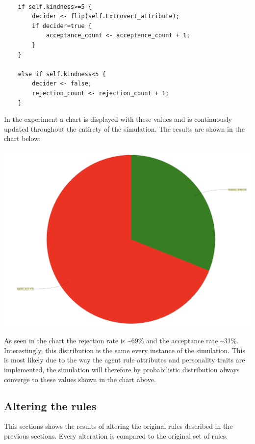 \documentclass[a4paper,10pt]{article}
\begin{document}
\begin{verbatim}

    if self.kindness>=5 {
		decider <- flip(self.Extrovert_attribute);
		if decider=true {
			acceptance_count <- acceptance_count + 1;
        }
    }
    
    else if self.kindness<5 {
	    decider <- false;
	    rejection_count <- rejection_count + 1;
    }
\end{verbatim}

In the experiment a chart is displayed with these values and is continuously updated throughout the entirety of the simulation. The results are shown in the chart below:

\begin{center}{}
\centering\includegraphics[scale=0.05]{original_exp.png}\par
\end{center}

As seen in the chart the rejection rate is \textasciitilde 69\% and the acceptance rate \textasciitilde 31\%. Interestingly, this distribution is the same every instance of the simulation. This is most likely due to the way the agent rule attributes and personality traits are implemented, the simulation will therefore by probabilistic distribution always converge to these values shown in the chart above. 

\subsection{Altering the rules}
This sections shows the results of altering the original rules described in the previous sections. Every alteration is compared to the original set of rules.
\end{document}
